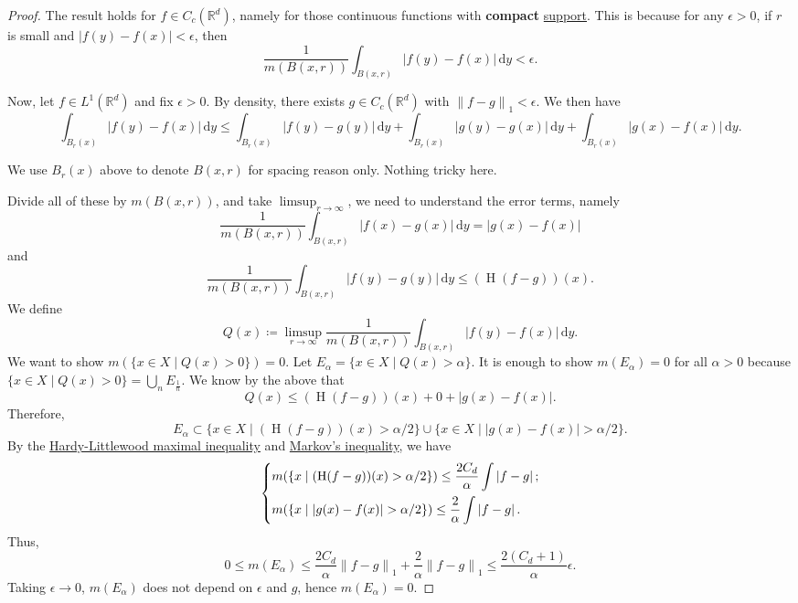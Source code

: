 \begin{proof}
	The result holds for \(f\in C_c(\mathbb{R} ^d)\), namely for those continuous functions with \textbf{compact} \hyperref[def:support]{support}.
	This is because for any \(\epsilon >0\), if \(r\) is small and \(\left\vert f(y) - f(x) \right\vert < \epsilon \), then
	\[
		\frac{1}{m(B(x, r))}\int _{B(x, r)}\left\vert f(y) - f(x) \right\vert \,\mathrm{d} y < \epsilon .
	\]

	Now, let \(f\in L^1(\mathbb{R} ^d)\) and fix \(\epsilon >0\). By density, there exists \(g\in C_c(\mathbb{R} ^d)\) with \(\left\lVert f-g\right\rVert _1<\epsilon \).
	We then have
	\[
		\int_{B_r(x)}\left\vert f(y) - f(x) \right\vert \,\mathrm{d} y
		\leq \int _{B_r(x)}\left\vert f(y) - g(y) \right\vert \,\mathrm{d} y
		+\int _{B_r(x)}\left\vert g(y) - g(x) \right\vert \,\mathrm{d} y
		+\int _{B_r(x)}\left\vert g(x) - f(x) \right\vert \,\mathrm{d} y.
	\]
	\begin{note}
		We use \(B_r(x)\) above to denote \(B(x, r)\) for spacing reason only. Nothing tricky here.
	\end{note}
	Divide all of these by \(m(B(x, r))\), and take \(\limsup_{r \to \infty} \), we need to understand the error terms, namely
	\[
		\frac{1}{m(B(x, r))}\int _{B(x, r)}\left\vert f(x) - g(x) \right\vert \,\mathrm{d} y = \left\vert g(x) - f(x) \right\vert
	\]
	and
	\[
		\frac{1}{m(B(x, r))}\int _{B(x, r)}\left\vert f(y) - g(y) \right\vert \,\mathrm{d} y \leq (\operatorname{H} (f-g))(x).
	\]
	We define
	\[
		Q(x) \coloneqq \limsup_{r \to \infty} \frac{1}{m(B(x, r))}\int _{B(x, r)} \left\vert f(y) - f(x) \right\vert \,\mathrm{d} y.
	\]
	We want to show \(m(\{x\in X\mid Q(x) > 0\}) = 0\). Let \(E_\alpha = \{x\in X\mid Q(x) > \alpha \}\). It is enough to show \(m(E_\alpha ) = 0\)
	for all \(\alpha >0\) because \(\{x\in X\mid Q(x)> 0\}= \bigcup_n E_{\frac{1}{n}}\). We know by the above that
	\[
		Q(x) \leq (\operatorname{H} (f-g))(x) + 0 + \left\vert g(x) - f(x) \right\vert.
	\]
	Therefore,
	\[
		E_\alpha \subset \{x\in X\mid (\operatorname{H} (f-g))(x) > \alpha /2\}\cup \{x\in X\mid \left\vert g(x) - f(x) \right\vert >\alpha /2\}.
	\]
	By the \hyperref[thm:HL-maximal-inequality]{Hardy-Littlewood maximal inequality} and \hyperref[lma:Markov-inequality]{Markov's inequality}, we have
	\[
		\begin{dcases}
			m(\left\{x\mid (\operatorname{H}(f-g))(x) > \alpha / 2\right\})                \leq \frac{2C_{d} }{\alpha }\int \left\vert f - g \right\vert; \\
			m(\left\{x\mid \left\vert g(x) - f(x) \right\vert > \alpha / 2\right\})  \leq \frac{2}{\alpha }\int \left\vert f - g \right\vert.
		\end{dcases}
	\]
	Thus,
	\[
		0\leq m(E_\alpha )\leq \frac{2C_d}{\alpha }\left\lVert f-g\right\rVert _1 + \frac{2}{\alpha }\left\lVert f-g\right\rVert _1 \leq \frac{2(C_{d} +1)}{\alpha }\epsilon.
	\]
	Taking \(\epsilon \to 0\), \(m(E_\alpha )\) does not depend on \(\epsilon \) and \(g\), hence \(m(E_\alpha) = 0\).
\end{proof}
